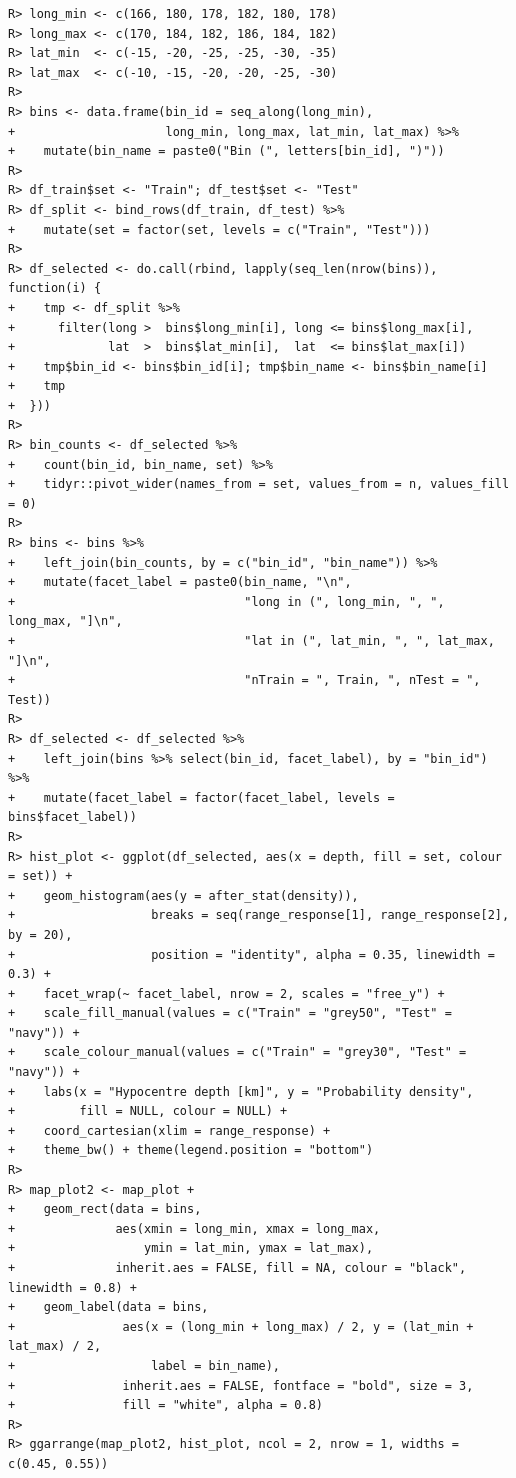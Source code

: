 \documentclass[
]{article}
\begin{document}
\begin{verbatim}
R> long_min <- c(166, 180, 178, 182, 180, 178)
R> long_max <- c(170, 184, 182, 186, 184, 182)
R> lat_min  <- c(-15, -20, -25, -25, -30, -35)
R> lat_max  <- c(-10, -15, -20, -20, -25, -30)
R> 
R> bins <- data.frame(bin_id = seq_along(long_min),
+                     long_min, long_max, lat_min, lat_max) %>%
+    mutate(bin_name = paste0("Bin (", letters[bin_id], ")"))
R> 
R> df_train$set <- "Train"; df_test$set <- "Test"
R> df_split <- bind_rows(df_train, df_test) %>%
+    mutate(set = factor(set, levels = c("Train", "Test")))
R> 
R> df_selected <- do.call(rbind, lapply(seq_len(nrow(bins)), function(i) {
+    tmp <- df_split %>%
+      filter(long >  bins$long_min[i], long <= bins$long_max[i],
+             lat  >  bins$lat_min[i],  lat  <= bins$lat_max[i])
+    tmp$bin_id <- bins$bin_id[i]; tmp$bin_name <- bins$bin_name[i]
+    tmp
+  }))
R> 
R> bin_counts <- df_selected %>%
+    count(bin_id, bin_name, set) %>%
+    tidyr::pivot_wider(names_from = set, values_from = n, values_fill = 0)
R> 
R> bins <- bins %>%
+    left_join(bin_counts, by = c("bin_id", "bin_name")) %>%
+    mutate(facet_label = paste0(bin_name, "\n",
+                                "long in (", long_min, ", ", long_max, "]\n",
+                                "lat in (", lat_min, ", ", lat_max, "]\n",
+                                "nTrain = ", Train, ", nTest = ", Test))
R> 
R> df_selected <- df_selected %>%
+    left_join(bins %>% select(bin_id, facet_label), by = "bin_id") %>%
+    mutate(facet_label = factor(facet_label, levels = bins$facet_label))
R> 
R> hist_plot <- ggplot(df_selected, aes(x = depth, fill = set, colour = set)) +
+    geom_histogram(aes(y = after_stat(density)),
+                   breaks = seq(range_response[1], range_response[2], by = 20),
+                   position = "identity", alpha = 0.35, linewidth = 0.3) +
+    facet_wrap(~ facet_label, nrow = 2, scales = "free_y") +
+    scale_fill_manual(values = c("Train" = "grey50", "Test" = "navy")) +
+    scale_colour_manual(values = c("Train" = "grey30", "Test" = "navy")) +
+    labs(x = "Hypocentre depth [km]", y = "Probability density",
+         fill = NULL, colour = NULL) +
+    coord_cartesian(xlim = range_response) +
+    theme_bw() + theme(legend.position = "bottom")
R> 
R> map_plot2 <- map_plot +
+    geom_rect(data = bins,
+              aes(xmin = long_min, xmax = long_max,
+                  ymin = lat_min, ymax = lat_max),
+              inherit.aes = FALSE, fill = NA, colour = "black", linewidth = 0.8) +
+    geom_label(data = bins,
+               aes(x = (long_min + long_max) / 2, y = (lat_min + lat_max) / 2,
+                   label = bin_name),
+               inherit.aes = FALSE, fontface = "bold", size = 3,
+               fill = "white", alpha = 0.8)
R> 
R> ggarrange(map_plot2, hist_plot, ncol = 2, nrow = 1, widths = c(0.45, 0.55))
\end{verbatim}
\end{document}
